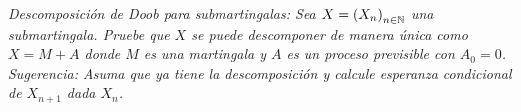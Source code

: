 \emph{
    Descomposici\'on de Doob para submartingalas: Sea $X=\left( X_n\right) _{n\in\mathbb{N}}$ una submartingala. 
    Pruebe que $X$ se puede descomponer de manera \'unica como $X=M+A$ donde $M$ es una martingala y $A$ 
    es un proceso previsible con $A_0=0$. Sugerencia: Asuma que ya tiene la descomposici\'on y calcule 
    esperanza condicional de $X_{n+1}$ dada $X_n$. 
}